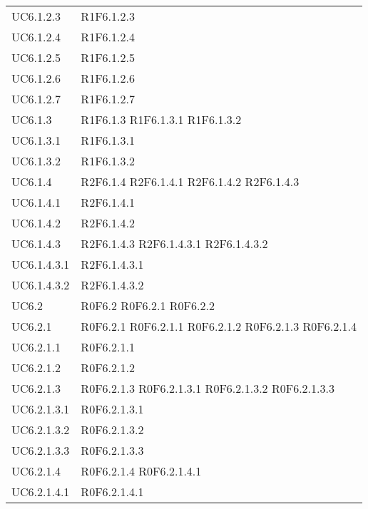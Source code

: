 \begin{longtable}{p{2.5cm}!{\VRule[1pt]}p{2.5cm}}
UC6.1.2.3 & R1F6.1.2.3\\
UC6.1.2.4 & R1F6.1.2.4\\
UC6.1.2.5 & R1F6.1.2.5\\
UC6.1.2.6 & R1F6.1.2.6\\
UC6.1.2.7 & R1F6.1.2.7\\
UC6.1.3 & R1F6.1.3
	\newline R1F6.1.3.1
	\newline R1F6.1.3.2\\
UC6.1.3.1 & R1F6.1.3.1\\
UC6.1.3.2 & R1F6.1.3.2\\
UC6.1.4 & R2F6.1.4
	\newline R2F6.1.4.1
	\newline R2F6.1.4.2
	\newline R2F6.1.4.3\\
UC6.1.4.1 & R2F6.1.4.1\\
UC6.1.4.2 & R2F6.1.4.2\\
UC6.1.4.3 & R2F6.1.4.3
	\newline R2F6.1.4.3.1
	\newline R2F6.1.4.3.2\\
UC6.1.4.3.1 & R2F6.1.4.3.1\\
UC6.1.4.3.2 & R2F6.1.4.3.2\\
UC6.2 & R0F6.2
	\newline R0F6.2.1
	\newline R0F6.2.2\\
UC6.2.1 & R0F6.2.1
	\newline R0F6.2.1.1
	\newline R0F6.2.1.2
	\newline R0F6.2.1.3
	\newline R0F6.2.1.4\\
UC6.2.1.1 & R0F6.2.1.1\\
UC6.2.1.2 & R0F6.2.1.2\\
UC6.2.1.3 & R0F6.2.1.3
	\newline R0F6.2.1.3.1
	\newline R0F6.2.1.3.2
	\newline R0F6.2.1.3.3\\
UC6.2.1.3.1 & R0F6.2.1.3.1\\
UC6.2.1.3.2 & R0F6.2.1.3.2\\
UC6.2.1.3.3 & R0F6.2.1.3.3\\
UC6.2.1.4 & R0F6.2.1.4
	\newline R0F6.2.1.4.1\\
UC6.2.1.4.1 & R0F6.2.1.4.1\\

\end{longtable}
